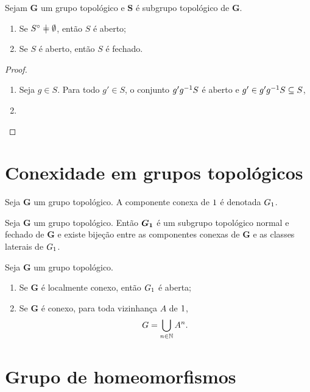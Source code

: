 \begin{proposition}
Sejam $\bm G$ um grupo topológico e $\bm S$ é subgrupo topológico de $\bm G$.
	\begin{enumerate}
	\item Se $\Int{S} \neq \emptyset$, então $S$ é aberto;
	\item Se $S$ é aberto, então $S$ é fechado.
	\end{enumerate}
\end{proposition}
\begin{proof}
	\begin{enumerate}
		\item Seja $g \in S$. Para todo $g' \in S$, o conjunto $g'g^{-1} S$ é aberto e $g'\in g'g^{-1} S \subseteq S$, 
		\item 
		\end{enumerate}
\end{proof}

\section{Conexidade em grupos topológicos}

\begin{definition}
Seja $\bm G$ um grupo topológico. A componente conexa de $1$ é denotada $G_1$.
\end{definition}

\begin{proposition}
Seja $\bm G$ um grupo topológico. Então $\bm{G_1}$ é um subgrupo topológico normal e fechado de $\bm G$ e existe bijeção entre as componentes conexas de $\bm G$ e as classes laterais de $G_1$.
\end{proposition}

\begin{proposition}
Seja $\bm G$ um grupo topológico.
	\begin{enumerate}
	\item Se $\bm G$ é localmente conexo, então $G_1$ é aberta;
	\item Se $\bm G$ é conexo, para toda vizinhança $A$ de $1$,
		\begin{equation*}
		G = \bigcup_{n \in \mathbb{N}} A^n.
		\end{equation*}
	\end{enumerate} 
\end{proposition}

\section{Grupo de homeomorfismos}

